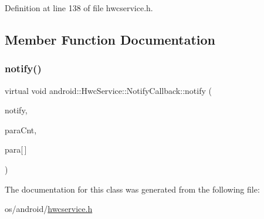 Definition at line 138 of file hwcservice.\+h.


\begin{DoxyCode}{0}
\end{DoxyCode}


\subsection{Member Function Documentation}
\mbox{\label{classandroid_1_1HwcService_1_1NotifyCallback_af51d502801ff7b7bbcd9a2d6b840cdd5}} 
\subsubsection{\texorpdfstring{notify()}{notify()}}
{\footnotesize\ttfamily virtual void android\+::\+Hwc\+Service\+::\+Notify\+Callback\+::notify (\begin{DoxyParamCaption}\item[{\mbox{\hyperlink{classandroid_1_1HwcService_a34049a831dd1c85ef002e59be99d1bd8}{E\+Notification}}}]{notify,  }\item[{int32\+\_\+t}]{para\+Cnt,  }\item[{int64\+\_\+t}]{para\mbox{[}$\,$\mbox{]} }\end{DoxyParamCaption})\hspace{0.3cm}{\ttfamily [pure virtual]}}



The documentation for this class was generated from the following file\+:\begin{DoxyCompactItemize}
\item 
os/android/\mbox{\hyperlink{hwcservice_8h}{hwcservice.\+h}}\end{DoxyCompactItemize}
